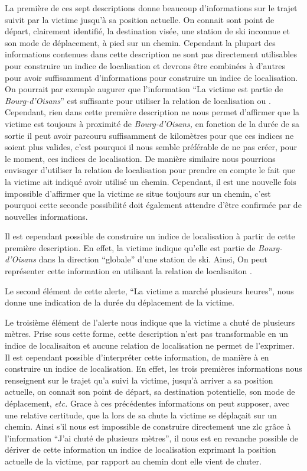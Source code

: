 La première de ces sept descriptions donne beaucoup d'informations sur
le trajet suivit par la victime jusqu'à sa position actuelle. On
connait sont point de départ, clairement identifié, la destination
visée, une station de ski inconnue et son mode de déplacement, à pied
sur un chemin. Cependant la plupart des informations contenues dans
cette description ne sont pas directement utilisables pour construire
un indice de localisation et devrons être combinées à d'autres pour
avoir suffisamment d'informations pour construire un indice de
localisation. On pourrait par exemple augurer que l'information
\enquote{La victime est partie de \emph{Bourg-d'Oisans}} est
suffisante pour utiliser la relation de localisation
 ou . Cependant,
rien dans cette première description ne nous permet d'affirmer que la
victime est toujours à proximité de \emph{Bourg-d'Oisans,} en fonction
de la durée de sa sortie il peut avoir parcouru suffisamment de
kilomètres pour que ces indices ne soient plus valides, c'est pourquoi
il nous semble préférable de ne pas créer, pour le moment, ces indices
de localisation. De manière similaire nous pourrions envisager
d'utiliser la relation de localisation
 pour
prendre en compte le fait que la victime ait indiqué avoir utilisé un
chemin. Cependant, il est une nouvelle fois impossible d'affirmer que
la victime se situe toujours sur un chemin, c'est pourquoi cette
seconde possibilité doit également attendre d'être confirmée par de
nouvelles informations.

Il est cependant possible de construire un indice de localisation à
partir de cette première description. En effet, la victime indique
qu'elle est partie de \emph{Bourg-d'Oisans} dans la direction
\enquote{globale} d'une station de ski. Ainsi, 
%
On peut représenter cette information en utilisant la relation de
localisaiton .


Le second élément de cette alerte, \enquote{La victime a marché
  plusieurs heures}, nous donne une indication de la durée du
déplacement de la victime. 


Le troisième élément de l'alerte nous indique que la victime a chuté
de plusieurs mètres. Prise sous cette forme, cette description n'est
pas transformable en un indice de localisaiton et aucune relation de
localisation ne permet de l'exprimer. Il est cependant possible
d'interpréter cette information, de manière à en construire un indice
de localisation. En effet, les trois premières informations nous
renseignent sur le trajet qu'a suivi la victime, jusqu'à arriver a sa
position actuelle, on connait son point de départ, sa destination
potentielle, son mode de déplacement, \emph{etc.} Grace à ces
précédentes informations on peut supposer, avec une relative
certitude, que la lors de sa chute la victime se déplaçait sur un
chemin. Ainsi s'il nous est impossible de construire directement une
\ac{zlc} grâce à l'information \enquote{J'ai chuté de plusieurs
  mètres}, il nous est en revanche possible de dériver de cette
information un indice de localisation exprimant la position actuelle
de la victime, par rapport au chemin dont elle vient de chuter.




